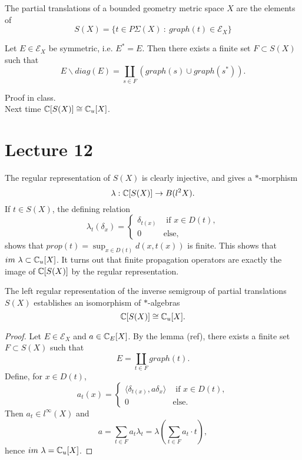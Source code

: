 The partial translations of a bounded geometry metric space $X$ are the elements of 
\[S(X) = \{ t\in P\Sigma(X) \ : \ graph(t)\in \mathcal E_X\}\]

\begin{lem}
Let $E\in \mathcal E_X$ be symmetric, i.e. $E^*=E$. Then there exists a finite set $F\subset S(X)$ such that 
\[E \backslash diag(E)=  \coprod_{s \in F} ( graph(s)\cup graph(s^*)).\]  
\end{lem}

Proof in class.\\

Next time $\mathbb C[S(X)] \cong \mathbb C_u[X]$.

\section{Lecture 12}

The regular representation of $S(X)$ is clearly injective, and gives a $*$-morphism
\[\lambda : \mathbb C[S(X)] \rightarrow B(l^2 X). \]
If $t\in S(X)$, the defining relation
\[\lambda_t(\delta_x) = \left\{\begin{array}{cc}\delta_{t(x)} & \text{ if }x\in D(t), \\ 0 & \text{else,}\end{array} \right. \] 
shows that $prop(t) = \sup_{x\in D(t)} d(x,t(x))$ is finite. This shows that $im \ \lambda \subset \mathbb C_u[X]$. It turns out that finite propagation operators are exactly the image of $\mathbb C[S(X)]$ by the regular representation.

\begin{prop}
The left regular representation of the inverse semigroup of partial translations $S(X)$ establishes an isomorphism of $*$-algebras
\[\mathbb C[S(X)] \cong \mathbb C_u[X].\]
\end{prop}

\begin{proof}
Let $E\in \mathcal E_X$ and $a\in \mathbb C_E[X]$. By the lemma (ref), there exists a finite set $F\subset S(X)$ such that 
\[E = \coprod_{t\in F} graph(t).\]
Define, for $x\in D(t)$, 
\[a_t(x) =\left\{\begin{array}{cc} 
\langle \delta_{t(x)} ,  a\delta_x\rangle & \text{ if }x\in D(t), \\ 
0 & \text{else.}\end{array} \right.\] 
Then $a_t \in l^\infty (X)$ and 
\[a = \sum_{t\in F} a_t \lambda_t = \lambda(\sum_{t\in F} a_t \cdot t), \]
hence $im \ \lambda = \mathbb C_u[X]$.  
\end{proof}

